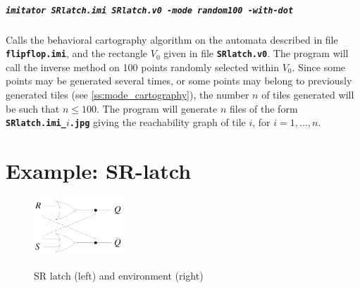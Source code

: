\documentclass[a4paper,11pt]{report}
\newcommand{\imitatorExec}{\code{imitator}}
\newcommand{\code}[1]{\textbf{\texttt{#1}}}
\begin{document}
\paragraph{\code{\imitatorExec{} SRlatch.imi SRlatch.v0 -mode random100 -with-dot}}
Calls the behavioral cartography algorithm on the automata described in file \code{flipflop.imi}, and the rectangle $V_0$ given in file \code{SRlatch.v0}.
The program will call the inverse method on 100 points randomly selected within $V_0$.
Since some points may be generated several times, or some points may belong to previously generated tiles (see \cref{ss:mode_cartography}), the number $n$ of tiles generated will be such that $n \leq 100$.
The program will generate $n$ files of the form \code{SRlatch.imi\_$i$.jpg} giving the reachability graph of tile $i$, for $i = 1, \dots, n$.



\chapter{Example: SR-latch} \label{sec:example}



\begin{figure}
\centering
\includegraphics[width=0.30\textwidth]{include/SRlatch.pdf}
\ \ \ \ \ \ \ \ 

\caption{SR latch (left) and environment (right)}
\label{fig:srlatch}
\end{figure}
\end{document}
